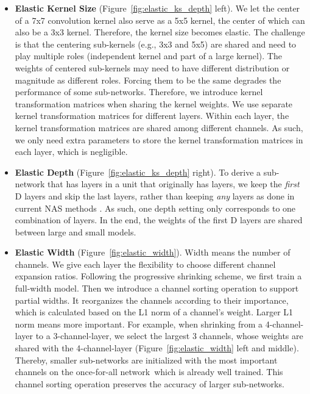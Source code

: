 \documentclass{article} \usepackage{iclr2020_conference,times}
\newcommand{\motherNet}{once-for-all network}
\begin{document}
\begin{itemize}[leftmargin=*]

\item \textbf{Elastic Kernel Size} (Figure~\ref{fig:elastic_ks_depth} left). We let the center of a 7x7 convolution kernel also serve as a 5x5 kernel, the center of which can also be a 3x3 kernel. Therefore, the kernel size becomes elastic.
The challenge is that the centering sub-kernels (e.g., 3x3 and 5x5) are shared and need to play multiple roles (independent kernel and part of a large kernel). The weights of centered sub-kernels may need to have different distribution or magnitude as different roles. Forcing them to be the same degrades the performance of some sub-networks. Therefore, we introduce kernel transformation matrices when sharing the kernel weights. We use separate kernel transformation matrices for different layers. Within each layer, the kernel transformation matrices are shared among different channels. As such, we only need  extra parameters to store the kernel transformation matrices in each layer, which is negligible. 

\item \textbf{Elastic Depth}  (Figure~\ref{fig:elastic_ks_depth} right). 
To derive a sub-network that has  layers in a unit that originally has  layers, we keep the \textit{first} D layers and skip the last  layers, rather than keeping \textit{any}  layers as done in current NAS methods \citep{cai2019proxylessnas,wu2018fbnet}. As such, one depth setting only corresponds to one combination of layers. In the end, the weights of the first D layers are shared between large and small models.

\item \textbf{Elastic Width} (Figure~\ref{fig:elastic_width}). Width means the number of channels. We give each layer the flexibility to choose different channel expansion ratios. Following the progressive shrinking scheme, we first train a full-width model. 
Then we introduce a channel sorting operation to support partial widths. It reorganizes the channels according to their importance, which is calculated based on the L1 norm of a channel's weight. Larger L1 norm means more important. For example, when shrinking from a 4-channel-layer to a 3-channel-layer, we select the largest 3 channels, whose weights are shared with the 4-channel-layer (Figure~\ref{fig:elastic_width} left and middle). Thereby, smaller sub-networks are initialized with the most important channels on the \motherNet~which is already well trained. This channel sorting operation preserves the accuracy of larger sub-networks.  

\end{itemize}
\end{document}
